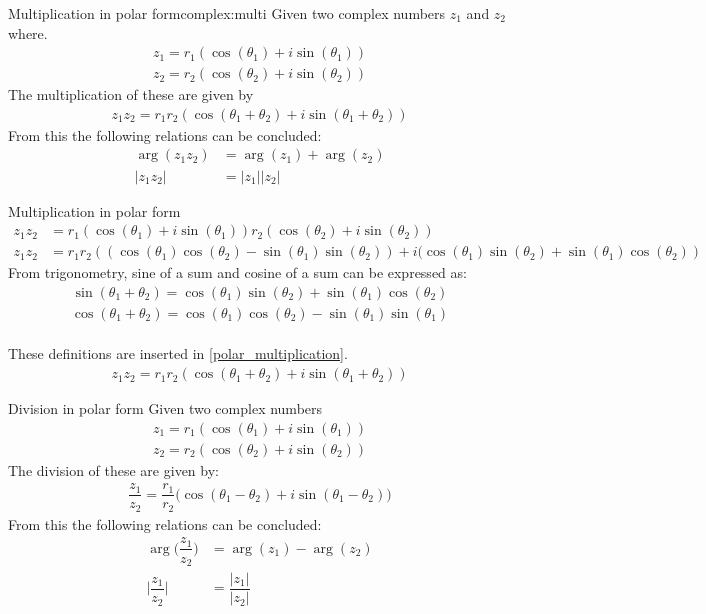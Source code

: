 \begin{theorem}{Multiplication in polar form}{complex:multi}
Given two complex numbers $z_1$ and $z_2$ where.
\begin{align*}
z_1=r_1(\cos(\theta_1)+i\sin(\theta_1)) 
\\
z_2=r_2(\cos(\theta_2)+i\sin(\theta_2))
\end{align*}
The multiplication of these are given by
\begin{align*}
z_1 z_2=r_1r_2\left( \cos(\theta_1+\theta_2)+ i \sin(\theta_1+\theta_2)\right)
\end{align*}
From this the following relations can be concluded:
\begin{align}
\arg(z_1z_2)&=\arg(z_1)+\arg(z_2)
\\
|z_1z_2|&=|z_1||z_2|
\end{align}
\end{theorem}
\begin{prof}{Multiplication in polar form}{}
\begin{align}
z_1 z_2&=r_1( \cos(\theta_1)+ i \sin(\theta_1))r_2( \cos(\theta_2)+ i \sin(\theta_2)) \nonumber
\\
\label{polar_multiplication}
z_1z_2&=r_1r_2\left( (\cos(\theta_1)\cos(\theta_2)-\sin(\theta_1) \sin(\theta_2))+i(\cos(\theta_1)\sin(\theta_2)+\sin(\theta_1)\cos(\theta_2)\right)
\end{align}
From trigonometry, sine of a sum and cosine of a sum can be expressed as:
\\
\begin{align} \label{sum_cos_sin}
\sin(\theta_1+\theta_2)=\cos(\theta_1)\sin(\theta_2)+\sin(\theta_1)\cos(\theta_2)
\end{align}
\begin{align*}
\cos(\theta_1+\theta_2)=\cos(\theta_1)\cos(\theta_2)-\sin(\theta_1)\sin(\theta_1)
\end{align*}
\\
These definitions are inserted in \eqref{polar_multiplication}.
\\
\begin{align*}
z_1 z_2=r_1r_2\left( \cos(\theta_1+\theta_2)+ i \sin(\theta_1+\theta_2)\right)
\end{align*}
\end{prof}
\begin{theorem}{Division in polar form}{}
Given two complex numbers
\begin{align*}
z_1=r_1(\cos(\theta_1)+i\sin(\theta_1)) 
\\
z_2=r_2(\cos(\theta_2)+i\sin(\theta_2))
\end{align*}
The division of these are given by:
\begin{align*}
\dfrac{z_1}{z_2}=\dfrac{r_1}{r_2}\Big( \cos(\theta_1-\theta_2)+ i \sin(\theta_1-\theta_2)\Big)
\end{align*}
From this the following relations can be concluded:
\begin{align}
\arg\Big(\dfrac{z_1}{z_2}\Big)&=\arg(z_1)-\arg(z_2)
\\
\Big|\dfrac{z_1}{z_2}\Big|&=\dfrac{|z_1|}{|z_2|} \label{eq:mod_div}
\end{align}
\end{theorem}

